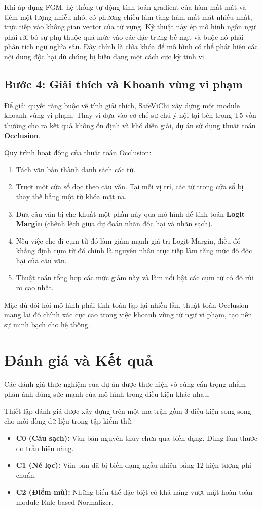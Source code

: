\documentclass[12pt,a4paper]{article}
\begin{document}
Khi áp dụng FGM, hệ thống tự động tính toán gradient của hàm mất mát và tiêm một lượng nhiễu nhỏ, có phương chiều làm tăng hàm mất mát nhiều nhất, trực tiếp vào không gian vector của từ vựng. Kỹ thuật này ép mô hình ngôn ngữ phải rời bỏ sự phụ thuộc quá mức vào các đặc trưng bề mặt và buộc nó phải phân tích ngữ nghĩa sâu. Đây chính là chìa khóa để mô hình có thể phát hiện các nội dung độc hại dù chúng bị biến dạng một cách cực kỳ tinh vi.

\subsection{Bước 4: Giải thích và Khoanh vùng vi phạm}
Để giải quyết ràng buộc về tính giải thích, SafeViChi xây dựng một module khoanh vùng vi phạm. Thay vì dựa vào cơ chế sự chú ý nội tại bên trong T5 vốn thường cho ra kết quả không ổn định và khó diễn giải, dự án sử dụng thuật toán \textbf{Occlusion}.

Quy trình hoạt động của thuật toán Occlusion:
\begin{enumerate}
    \item Tách văn bản thành danh sách các từ.
    \item Trượt một cửa sổ dọc theo câu văn. Tại mỗi vị trí, các từ trong cửa sổ bị thay thế bằng một từ khóa mặt nạ.
    \item Đưa câu văn bị che khuất một phần này qua mô hình để tính toán \textbf{Logit Margin} (chênh lệch giữa dự đoán nhãn độc hại và nhãn sạch).
    \item Nếu việc che đi cụm từ đó làm giảm mạnh giá trị Logit Margin, điều đó khẳng định cụm từ đó chính là nguyên nhân trực tiếp làm tăng mức độ độc hại của câu văn.
    \item Thuật toán tổng hợp các mức giảm này và làm nổi bật các cụm từ có độ rủi ro cao nhất.
\end{enumerate}
Mặc dù đòi hỏi mô hình phải tính toán lặp lại nhiều lần, thuật toán Occlusion mang lại độ chính xác cực cao trong việc khoanh vùng từ ngữ vi phạm, tạo nên sự minh bạch cho hệ thống.

\newpage
\section{Đánh giá và Kết quả}
Các đánh giá thực nghiệm của dự án được thực hiện vô cùng cẩn trọng nhằm phản ánh đúng sức mạnh của mô hình trong điều kiện khác nhau.

Thiết lập đánh giá được xây dựng trên một ma trận gồm 3 điều kiện song song cho mỗi dòng dữ liệu trong tập kiểm thử:
\begin{itemize}
    \item \textbf{C0 (Câu sạch):} Văn bản nguyên thủy chưa qua biến dạng. Dùng làm thước đo trần hiệu năng.
    \item \textbf{C1 (Né lọc):} Văn bản đã bị biến dạng ngẫu nhiên bằng 12 hiện tượng phi chuẩn.
    \item \textbf{C2 (Điểm mù):} Những biến thể đặc biệt có khả năng vượt mặt hoàn toàn module Rule-based Normalizer.
\end{itemize}
\end{document}

